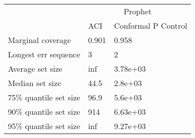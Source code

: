 \begin{tabular}{lll}
\toprule
& \multicolumn{2}{c}{Prophet} \\
& ACI & Conformal P Control \\
\midrule
Marginal coverage & 0.901 & 0.958 \\
Longest err sequence & 3 & 2 \\
Average set size & inf & 3.78e+03 \\
Median set size & 44.5 & 2.8e+03 \\
75\% quantile set size & 96.9 & 5.6e+03 \\
90\% quantile set size & 914 & 6.63e+03 \\
95\% quantile set size & inf & 9.27e+03 \\
\bottomrule
\end{tabular}
